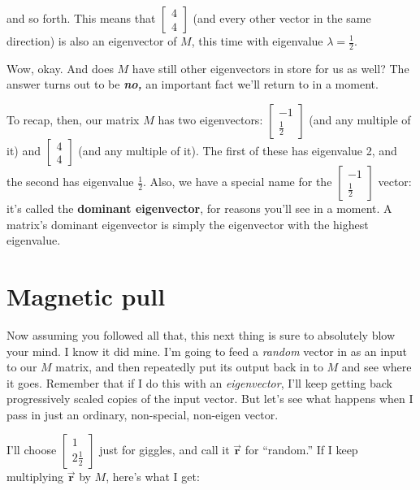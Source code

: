 and so forth. This means that {\footnotesize $\begin{bmatrix} 4 \\ 4
\end{bmatrix}$} (and every other vector in the same direction) is also an
eigenvector of $M$, this time with eigenvalue $\lambda=\frac{1}{2}$.

\bigskip

Wow, okay. And does $M$ have still other eigenvectors in store for us as well?
The answer turns out to be \textbf{\textit{no,}} an important fact we'll return
to in a moment.

\medskip


To recap, then, our matrix $M$ has two eigenvectors: {\scriptsize
$\begin{bmatrix} -1 \\ \frac{1}{2} \end{bmatrix}$} (and any multiple of it) and
{\scriptsize $\begin{bmatrix} 4 \\ 4 \end{bmatrix}$} (and any multiple of it).
The first of these has eigenvalue 2, and the second has eigenvalue
$\frac{1}{2}$. Also, we have a special name for the {\scriptsize
$\begin{bmatrix} -1 \\ \frac{1}{2} \end{bmatrix}$} vector: it's called the
\textbf{dominant eigenvector}, for reasons you'll see in a moment. A matrix's
dominant eigenvector is simply the eigenvector with the highest eigenvalue.

\section{Magnetic pull}

Now assuming you followed all that, this next thing is sure to absolutely blow
your mind. I know it did mine. I'm going to feed a \textit{random} vector in as
an input to our $M$ matrix, and then repeatedly put its output back in to $M$
and see where it goes. Remember that if I do this with an \textit{eigenvector},
I'll keep getting back progressively scaled copies of the input vector. But
let's see what happens when I pass in just an ordinary, non-special, non-eigen
vector.

I'll choose {\footnotesize $\begin{bmatrix} 1 \\ 2\frac{1}{2} \end{bmatrix}$}
just for giggles, and call it $\overrightarrow{\textbf{r}}$ for ``random.'' If
I keep multiplying $\overrightarrow{\textbf{r}}$ by $M$, here's what I get:

